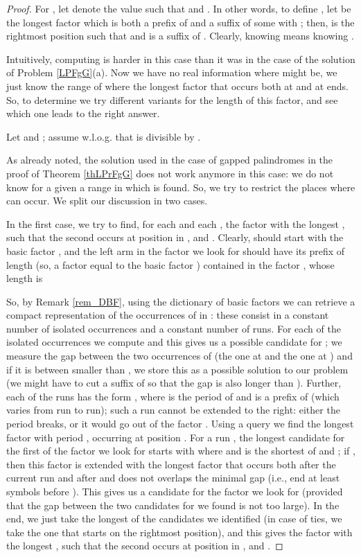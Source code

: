 \documentclass[final]{dmtcs-episciences}
\begin{document}
\begin{proof}
For , let  denote the value  such that  and . 
In other words, to define , let  be the longest factor which is both a prefix of  and a suffix of some  with ; then,  is the rightmost position  such that  and  is a suffix of . Clearly, knowing  means knowing . 

Intuitively, computing  is harder in this case than it was in the case of the solution of Problem \ref{LPFgG}(a). Now we have no real information where  might be, we just know the range of  where the longest factor that occurs both at  and at  ends. So, to determine  we try different variants for the length of this factor, and see which one leads to the right answer. 

Let  and ; assume w.l.o.g. that  is divisible by . 

As already noted, the solution used in the case of gapped palindromes in the proof of Theorem \ref{thLPrFgG} does not work anymore in this case: we do not know for a given  a range in which  is found. So, we try to restrict the places where  can occur. We split our discussion in two cases.

In the first case, we try to find, for each  and each , the factor  with the longest , such that the second  occurs at position  in ,  and . Clearly,  should start with the basic factor , and the left arm  in the factor  we look for should have its prefix of length  (so, a factor equal to the basic factor ) contained in the factor , whose length is \centerline{} So, by Remark \ref{rem_DBF}, using the dictionary of basic factors we can 
retrieve a compact representation of the occurrences of  in : these consist in a constant number of isolated occurrences and a constant number of runs. For each of the isolated occurrences  we compute  and this gives us a possible candidate for ; we measure the gap between the two occurrences of  (the one at  and the one at ) and if it is between smaller than , we store this  as a possible solution to our problem (we might have to cut a suffix of  so that the gap is also longer than ). Further, each of the runs has the form , where  is the period of  and  is a prefix of  (which varies from run to run); such a run cannot be extended to the right: either the period breaks, or it would go out of the factor . Using a  query we find the longest factor  with period , occurring at position . For a run , the longest candidate for the first  of the factor  we look for starts with  where  and  is the shortest of  and ; if , then this factor is extended with the longest factor that occurs both after the current run and after  and does not overlaps the minimal gap (i.e., end at least  symbols before ). This gives us 
a candidate for the factor  we look for (provided that the gap between the two candidates for  we found is not too large). In the end, we just take the longest of the candidates we identified (in case of ties, we take the one that starts on the rightmost position), and this gives the factor  with the longest , such that the second  occurs at position  in ,  and . 


\end{proof}
\end{document}
